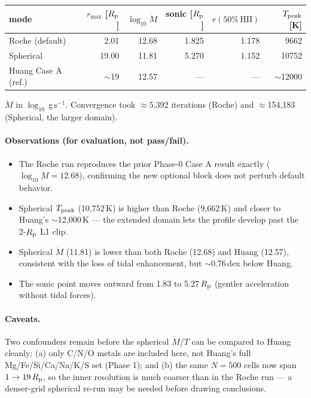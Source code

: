 \documentclass[english,a4paper]{kiseon_memo}
\begin{document}
\begin{center}
\begin{tabular}{lrrrrr}
\toprule
mode & $r_{\max}$ [$R_{\rm p}$] & $\log_{10}\dot M$ & sonic [$R_{\rm p}$]
     & $r(50\%\,\mathrm{HII})$ & $T_{\rm peak}$ [K] \\
\midrule
Roche (default)     &  2.01 & 12.68 & 1.825 & 1.178 &  9662 \\
Spherical           & 19.00 & 11.81 & 5.270 & 1.152 & 10752 \\
\midrule
Huang Case A (ref.) & $\sim$19 & 12.57 & --- & --- & $\sim$12000 \\
\bottomrule
\end{tabular}
\end{center}

\noindent$\dot M$ in $\log_{10}$\,g\,s$^{-1}$. Convergence took
$\approx$5{,}392 iterations (Roche) and $\approx$154{,}183 (Spherical, the
larger domain).

\paragraph{Observations (for evaluation, not pass/fail).}
\begin{itemize}
\item The Roche run reproduces the prior Phase-0 Case A result exactly
  ($\log_{10}\dot M = 12.68$), confirming the new optional block does not
  perturb default behavior.
\item Spherical $T_{\rm peak}$ (10{,}752\,K) is higher than Roche (9{,}662\,K)
  and closer to Huang's $\sim$12{,}000\,K --- the extended domain lets the
  profile develop past the 2-$R_{\rm p}$ L1 clip.
\item Spherical $\dot M$ (11.81) is lower than both Roche (12.68) and Huang
  (12.57), consistent with the loss of tidal enhancement, but $\sim$0.76\,dex
  below Huang.
\item The sonic point moves outward from 1.83 to 5.27\,$R_{\rm p}$ (gentler
  acceleration without tidal forces).
\end{itemize}

\paragraph{Caveats.} Two confounders remain before the spherical $\dot M$/$T$
can be compared to Huang cleanly: (a) only C/N/O metals are included here, not
Huang's full Mg/Fe/Si/Ca/Na/K/S set (Phase 1); and (b) the same $N=500$ cells
now span $1\to19\,R_{\rm p}$, so the inner resolution is much coarser than in
the Roche run --- a denser-grid spherical re-run may be needed before drawing
conclusions.
\end{document}
